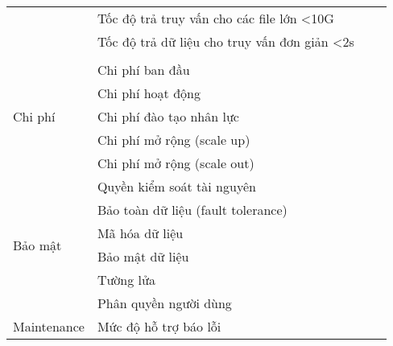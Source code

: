 \begin{longtable}{|l|p{5cm}|ll|}
                           & Tốc độ trả   truy vấn cho các file lớn \textless{}10G                   & \multicolumn{1}{l|}{}        &        \\ \cline{2-4} 
                           & Tốc độ trả dữ   liệu cho truy vấn đơn giản \textless{}2s                & \multicolumn{1}{l|}{}        &        \\ \cline{2-4} 
                             &                                                & \multicolumn{1}{l|}{}          &     \\ \hline
\multirow{5}{*}{Chi phí}     & Chi phí ban đầu                                & \multicolumn{1}{l|}{}          &     \\ \cline{2-4} 
                             & Chi phí hoạt   động                            & \multicolumn{1}{l|}{}          &     \\ \cline{2-4} 
                             & Chi phí đào   tạo nhân lực                     & \multicolumn{1}{l|}{}          &     \\ \cline{2-4} 
                             & Chi phí mở   rộng (scale up)                   & \multicolumn{1}{l|}{}          &     \\ \cline{2-4} 
                             & Chi phí mở   rộng (scale out)                  & \multicolumn{1}{l|}{}          &     \\ \hline
\multirow{6}{*}{Bảo mật}     & Quyền kiểm soát tài   nguyên                   & \multicolumn{1}{l|}{}          &     \\ \cline{2-4} 
                             & Bảo toàn dữ   liệu (fault tolerance)           & \multicolumn{1}{l|}{}          &     \\ \cline{2-4} 
                             & Mã hóa dữ   liệu                               & \multicolumn{1}{l|}{}          &     \\ \cline{2-4} 
                             & Bảo mật dữ   liệu                              & \multicolumn{1}{l|}{}          &     \\ \cline{2-4} 
                             & Tường lửa                                      & \multicolumn{1}{l|}{}          &     \\ \cline{2-4} 
                             & Phân quyền   người dùng                        & \multicolumn{1}{l|}{}          &     \\ \hline
\multirow{5}{*}{Maintenance} & Mức độ hỗ trợ báo lỗi                          & \multicolumn{1}{l|}{}          &     \\ \cline{2-4} 

\end{longtable}
